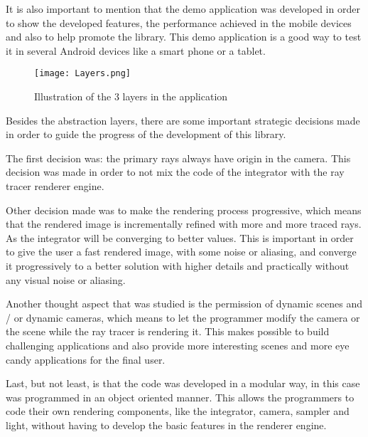 \par
It is also important to mention that the demo application was developed in order to show the developed features, the performance achieved in the mobile devices and also to help promote the library.
This demo application is a good way to test it in several Android devices like a smart phone or a tablet.

\begin{figure}[H]
	\centering
	\caption{Illustration of the 3 layers in the application}
	\label{Illustration of the 3 layers in the application}
	\texttt{[image: Layers.png]}
\end{figure}

\par
Besides the abstraction layers, there are some important strategic decisions made in order to guide the progress of the development of this library.

\par
The first decision was: the primary rays always have origin in the camera.
This decision was made in order to not mix the code of the integrator with the ray tracer renderer engine.

\par
Other decision made was to make the rendering process progressive, which means that the rendered image is incrementally refined with more and more traced rays.
As the integrator will be converging to better values.
This is important in order to give the user a fast rendered image, with some noise or aliasing, and converge it progressively to a better solution with higher details and practically without any visual noise or aliasing.

\par
Another thought aspect that was studied is the permission of dynamic scenes and / or dynamic cameras, which means to let the programmer modify the camera or the scene while the ray tracer is rendering it.
This makes possible to build challenging applications and also provide more interesting scenes and more eye candy applications for the final user.

\par
Last, but not least, is that the code was developed in a modular way, in this case was programmed in an object oriented manner.
This allows the programmers to code their own rendering components, like the integrator, camera, sampler and light, without having to develop the basic features in the renderer engine.

